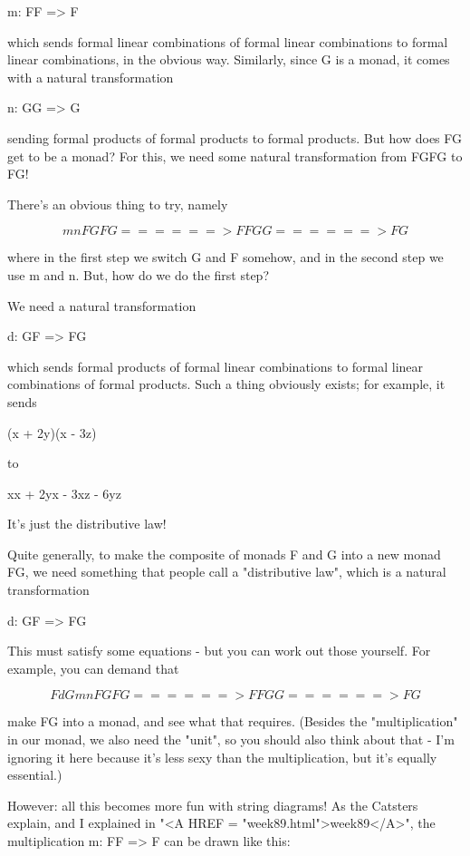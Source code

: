 m: FF => F

which sends formal linear combinations of formal linear combinations
to formal linear combinations, in the obvious way.  Similarly,
since G is a monad, it comes with a natural transformation

n: GG => G

sending formal products of formal products to formal products.
But how does FG get to be a monad?  For this, we need some 
natural transformation from FGFG to FG!

There's an obvious thing to try, namely


$$

                    mn 
FGFG ======> FFGG ======> FG
$$
    
where in the first step we switch G and F somehow, and in the
second step we use m and n.  But, how do we do the first step?

We need a natural transformation

d: GF => FG

which sends formal products of formal linear combinations
to formal linear combinations of formal products.  Such a
thing obviously exists; for example, it sends

(x + 2y)(x - 3z) 

to

xx + 2yx - 3xz - 6yz

It's just the distributive law!  

Quite generally, to make the composite of monads F and 
G into a new monad FG, we need something that people call a
"distributive law", which is a natural transformation

d: GF => FG

This must satisfy some equations - but you can work out
those yourself.  For example, you can demand that


$$

       FdG          mn 
FGFG ======> FFGG ======> FG

$$
    

make FG into a monad, and see what that requires.  (Besides the
"multiplication" in our monad, we also need the
"unit", so you should also think about that - I'm ignoring
it here because it's less sexy than the multiplication, but it's
equally essential.)

However: all this becomes more fun with string diagrams!  As the
Catsters explain, and I explained in "<A HREF =
"week89.html">week89</A>", the multiplication m: FF => F can
be drawn like this:


